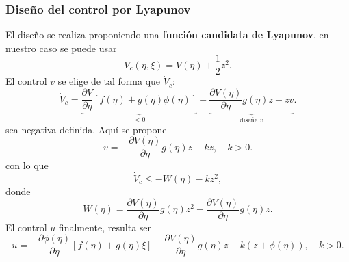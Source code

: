 \subsubsection{Diseño del control por Lyapunov} El diseño se realiza proponiendo una \textbf{función candidata de Lyapunov}, en nuestro caso se puede usar
\begin{equation*}
	V_c(\eta, \xi) = V(\eta) + \dfrac{1}{2}z^2.
\end{equation*}
El control $v$ se elige de tal forma que $\dot{V}_c$:
\begin{equation*}
	\dot{V}_c = \underbrace{\dfrac{\partial V}{\partial \eta} [f(\eta) + g(\eta)\phi(\eta)]}_{<0} + \underbrace{\dfrac{\partial V(\eta)}{\partial \eta}g(\eta)z + zv}_{\text{diseñe } v}.
\end{equation*}
sea negativa definida. Aquí se propone
\begin{equation*}
	v = -\dfrac{\partial V(\eta)}{\partial \eta}g(\eta)z - kz, \quad k > 0.
\end{equation*}
con lo que
\begin{equation*}
	\dot{V}_c \leq -W(\eta) -kz^2,
\end{equation*}
donde
\begin{equation*}
	W(\eta) = \dfrac{\partial V(\eta)}{\partial \eta}g(\eta)z^2 - \dfrac{\partial V(\eta)}{\partial \eta}g(\eta)z.
\end{equation*}
El control $u$ finalmente, resulta ser
\begin{equation*}
	u = -\dfrac{\partial \phi(\eta)}{\partial \eta} [f(\eta) + g(\eta)\xi] - \dfrac{\partial V(\eta)}{\partial \eta}g(\eta)z - k(z + \phi(\eta)), \quad k > 0.
\end{equation*}



